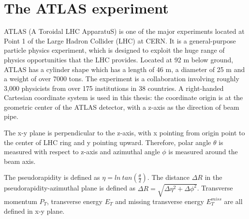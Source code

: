 \chapter{The ATLAS experiment}

\label{ch:atlas}
\par ATLAS (A Toroidal LHC ApparatuS) is one of the major experiments located at Point 1 of the Large Hadron Collider (LHC) at CERN. 
It is a general-purpose particle physics experiment, which is designed to exploit the huge range of physics opportunities that the LHC provides. 
		Located at 92 m below ground, ATLAS has a cylinder shape which has a length of  46 m, a diameter of 25 m and a weight of over 7000 tons.
 The experiment is a collaboration involving roughly 3,000 physicists from over 175 institutions in 38 countries\cite{fact}.
A right-handed Cartesian coordinate system is used in this thesis: the coordinate origin is at the geometric center of the ATLAS detector, with a z-axis as 
the direction of beam pipe.
\par The x-y plane is perpendicular to the z-axis, with x pointing from origin point to the center 
of LHC ring and y pointing upward. Therefore, polar angle $\theta$ is measured with respect to z-axis and azimuthal angle $\phi$ is measured around the beam axis. 
\par The pseudorapidity is defined as $\eta = ln~tan(\frac{\theta}{2})$. The distance $\Delta R$ in the pseudorapidity-azimuthal plane is defined as 
$\Delta R = \sqrt{\Delta\eta^2 + \Delta\phi^2}$. Transverse momentum $P_T$, transverse energy $E_T$ and missing transverse energy $E_T^{miss}$ are all defined in x-y plane.				

